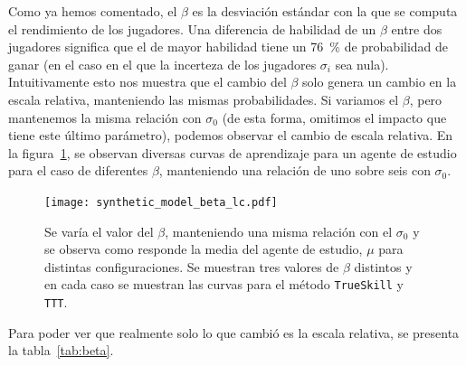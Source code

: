 \documentclass[11pt,twoside,spanish]{report} %
\begin{document}
Como ya hemos comentado, el $\beta$ es la desviaci\'on est\'andar con la que se computa el rendimiento de los jugadores.
Una diferencia de habilidad de un $\beta$ entre dos jugadores significa que el de mayor habilidad tiene un \SI{76}{\percent} de probabilidad de ganar (en el caso en el que la incerteza de los jugadores $\sigma_i$ sea nula).
Intuitivamente esto nos muestra que el cambio del $\beta$ solo genera un cambio en la escala relativa, manteniendo las mismas probabilidades.
Si variamos el $\beta$, pero mantenemos la misma relaci\'on con $\sigma_0$ (de esta forma, omitimos el impacto que tiene este \'ultimo par\'ametro), podemos observar el cambio de escala relativa.
En la figura~\ref{fig:beta_lc}, se observan diversas curvas de aprendizaje para un agente de estudio para el caso de diferentes $\beta$, manteniendo una relaci\'on de uno sobre seis con $\sigma_0$.


\begin{figure}[H]
	\centering
	\texttt{[image: synthetic\_model\_beta\_lc.pdf]}
	\caption{Se var\'ia el valor del $\beta$, manteniendo una misma relaci\'on con el $\sigma_0$ y se observa como responde la media del agente de estudio, $\mu$ para distintas configuraciones. Se muestran tres valores de $\beta$ distintos y en cada caso se muestran las curvas para el m\'etodo \texttt{TrueSkill} y \texttt{TTT}.}
	\label{fig:beta_lc}
\end{figure}




Para poder ver que realmente solo lo que cambi\'o es la escala relativa, se presenta la tabla~\ref{tab:beta}.
\end{document}
